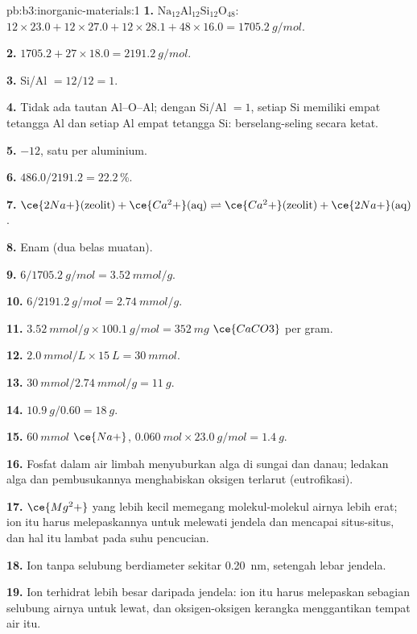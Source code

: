 \begin{solution}{pb:b3:inorganic-materials:1}
\textbf{1.} $\mathrm{Na_{12}Al_{12}Si_{12}O_{48}}$: $12 \times 23.0 + 12 \times 27.0 + 12 \times 28.1 + 48 \times 16.0 = \qty{1705.2}{g/mol}$.

\textbf{2.} $1705.2 + 27 \times 18.0 = \qty{2191.2}{g/mol}$.

\textbf{3.} Si/Al $= 12/12 = 1$.

\textbf{4.} Tidak ada tautan Al--O--Al; dengan Si/Al $= 1$, setiap Si memiliki empat tetangga Al dan setiap
Al empat tetangga Si: berselang-seling secara ketat.

\textbf{5.} $-12$, satu per aluminium.

\textbf{6.} $486.0/2191.2 = 22.2$\,\%.

\textbf{7.} $\ce{2Na+}(\text{zeolit}) + \ce{Ca^2+}(\text{aq}) \rightleftharpoons \ce{Ca^2+}(\text{zeolit}) + \ce{2Na+}(\text{aq})$.

\textbf{8.} Enam (dua belas muatan).

\textbf{9.} $6/\qty{1705.2}{g/mol} = \qty{3.52}{mmol/g}$.

\textbf{10.} $6/\qty{2191.2}{g/mol} = \qty{2.74}{mmol/g}$.

\textbf{11.} $\qty{3.52}{mmol/g} \times \qty{100.1}{g/mol} = \qty{352}{mg}$ $\ce{CaCO3}$ per gram.

\textbf{12.} $\qty{2.0}{mmol/L} \times \qty{15}{L} = \qty{30}{mmol}$.

\textbf{13.} $\qty{30}{mmol}/\qty{2.74}{mmol/g} = \qty{11}{g}$.

\textbf{14.} $\qty{10.9}{g}/0.60 = \qty{18}{g}$.

\textbf{15.} $\qty{60}{mmol}$ $\ce{Na+}$, $\qty{0.060}{mol} \times \qty{23.0}{g/mol} = \qty{1.4}{g}$.

\textbf{16.} Fosfat dalam air limbah menyuburkan alga di sungai dan danau; ledakan alga
dan pembusukannya menghabiskan oksigen terlarut (eutrofikasi).

\textbf{17.} $\ce{Mg^2+}$ yang lebih kecil memegang molekul-molekul airnya lebih erat; ion itu harus melepaskannya
untuk melewati jendela dan mencapai situs-situs, dan hal itu lambat pada suhu pencucian.

\textbf{18.} Ion tanpa selubung berdiameter sekitar \qty{0.20}{nm}, setengah lebar jendela.

\textbf{19.} Ion terhidrat lebih besar daripada jendela: ion itu harus melepaskan sebagian
selubung airnya untuk lewat, dan oksigen-oksigen kerangka menggantikan tempat
air itu.


\end{solution}
